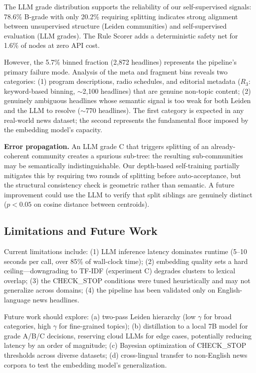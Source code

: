 \documentclass[10pt,twocolumn,twoside]{article}
\begin{document}
The LLM grade distribution supports the reliability of our self-supervised signals: 78.6\% 
B-grade with only 20.2\% requiring splitting indicates strong alignment between unsupervised 
structure (Leiden communities) and self-supervised evaluation (LLM grades). The Rule Scorer 
adds a deterministic safety net for 1.6\% of nodes at zero API cost.

However, the 5.7\% binned fraction (2,872 headlines) represents the pipeline's primary 
failure mode. Analysis of the meta and fragment bins reveals two categories: (1) program 
descriptions, radio schedules, and editorial metadata ($R_3$: keyword-based binning, $\sim$2,100 
headlines) that are genuine non-topic content; (2) genuinely ambiguous headlines whose 
semantic signal is too weak for both Leiden and the LLM to resolve ($\sim$770 headlines). 
The first category is expected in any real-world news dataset; the second represents the 
fundamental floor imposed by the embedding model's capacity.

\textbf{Error propagation.} An LLM grade C that triggers splitting of an already-coherent 
community creates a spurious sub-tree: the resulting sub-communities may be semantically 
indistinguishable. Our depth-based self-training partially mitigates this by requiring 
two rounds of splitting before auto-acceptance, but the structural consistency check is 
geometric rather than semantic. A future improvement could use the LLM to verify that 
split siblings are genuinely distinct ($p < 0.05$ on cosine distance between centroids).

\subsection{Limitations and Future Work}

Current limitations include: (1) LLM inference latency dominates runtime (5--10 seconds per 
call, over 85\% of wall-clock time); (2) embedding quality sets a hard ceiling---downgrading 
to TF-IDF (experiment C) degrades clusters to lexical overlap; (3) the CHECK\_STOP conditions 
were tuned heuristically and may not generalize across domains; (4) the pipeline has been 
validated only on English-language news headlines.

Future work should explore: (a) two-pass Leiden hierarchy (low $\gamma$ for broad categories, 
high $\gamma$ for fine-grained topics); (b) distillation to a local 7B model for grade 
A/B/C decisions, reserving cloud LLMs for edge cases, potentially reducing latency by an 
order of magnitude; (c) Bayesian optimization of CHECK\_STOP thresholds across diverse 
datasets; (d) cross-lingual transfer to non-English news corpora to test the embedding 
model's generalization.
\end{document}
